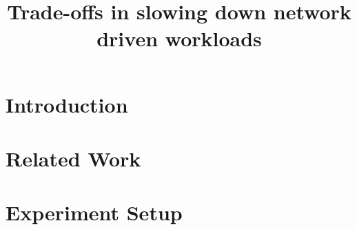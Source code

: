 \documentclass[sigplan,10pt]{acmart}
\begin{document}
\title{Trade-offs in slowing down network driven workloads}


\maketitle

\section{Introduction}


\section{Related Work}


\section{Experiment Setup}




\end{document}
